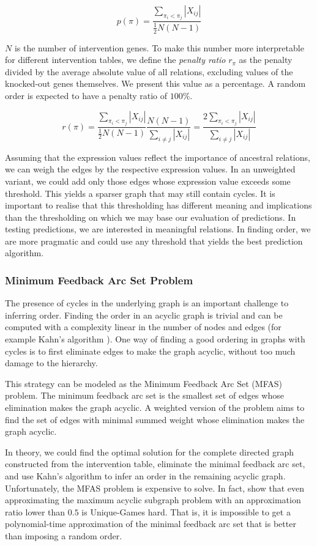 $$p(\pi) = \frac{\sum_{\pi_i < \pi_j}|X_{ij}|}{\frac{1}{2}N(N-1)}$$

$N$ is the number of intervention genes. To make this number more interpretable for different intervention tables, we define the \textit{penalty ratio} $r_\pi$ as the penalty divided by the average absolute value of all relations, excluding values of the knocked-out genes themselves. We present this value as a percentage. A random order is expected to have a penalty ratio of $100\%$.

$$r(\pi) = \frac{\sum_{\pi_i < \pi_j}|X_{ij}|}{\frac{1}{2}N(N-1)} \frac{N(N-1)}{\sum_{i \neq j}|X_{ij}|} = \frac{2 \sum_{\pi_i < \pi_j}|X_{ij}|}{\sum_{i \neq j}|X_{ij}|}$$

Assuming that the expression values reflect the importance of ancestral relations, we can weigh the edges by the respective expression values. In an unweighted variant, we could add only those edges whose expression value exceeds some threshold. This yields a sparser graph that may still contain cycles. It is important to realise that this thresholding has different meaning and implications than the thresholding on which we may base our evaluation of predictions. In testing predictions, we are interested in meaningful relations. In finding order, we are more pragmatic and could use any threshold that yields the best prediction algorithm.

\subsubsection{Minimum Feedback Arc Set Problem}
The presence of cycles in the underlying graph is an important challenge to inferring order. Finding the order in an acyclic graph is trivial and can be computed with a complexity linear in the number of nodes and edges (for example Kahn's algorithm \citep{kahn1962topological}). One way of finding a good ordering in graphs with cycles is to first eliminate edges to make the graph acyclic, without too much damage to the hierarchy.

This strategy can be modeled as the Minimum Feedback Arc Set (MFAS) problem. The minimum feedback arc set is the smallest set of edges whose elimination makes the graph acyclic. A weighted version of the problem aims to find the set of edges with minimal summed weight whose elimination makes the graph acyclic.

In theory, we could find the optimal solution for the complete directed graph constructed from the intervention table, eliminate the minimal feedback arc set, and use Kahn's algorithm to infer an order in the remaining acyclic graph. Unfortunately, the MFAS problem is expensive to solve. In fact, \citet{guruswami2008beating} show that even approximating the maximum acyclic subgraph problem with an approximation ratio lower than $0.5$ is Unique-Games hard. That is, it is impossible to get a polynomial-time approximation of the minimal feedback arc set that is better than imposing a random order.

